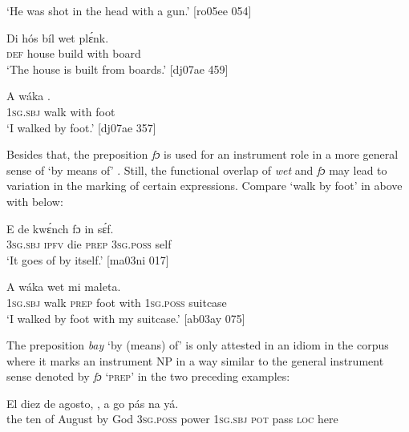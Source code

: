 \glt ‘He was shot in the head with a gun.’ [ro05ee 054]
\z


\ea%
    \label{ex:key:1066}
    \gll Di  hós    bíl    wet    plɛ́nk.\\
\textsc{def}  house  build  with    board\\

\glt ‘The house is built from boards.’ [dj07ae 459]
\z


\ea%
    \label{ex:key:1067}
    \gll A    wáka      .\\
\textsc{1sg.sbj}  walk  with    foot\\

\glt ‘I walked by foot.’ [dj07ae 357]
\z

Besides that, the preposition \textit{fɔ} is used for an instrument role in a more general sense of ‘by means of’ . Still, the functional overlap of \textit{wet} and \textit{fɔ} may lead to variation in the marking of certain expressions. Compare ‘walk by foot’ in  above with  below: 


\ea%
    \label{ex:key:1068}
    \gll E    de  kwɛ́nch  fɔ  in    sɛ́f.\\
\textsc{3sg.sbj}  \textsc{ipfv}  die    \textsc{prep}  \textsc{3sg.poss}  self\\

\glt ‘It goes of by itself.’ [ma03ni 017]\index{}
\z


\ea%
    \label{ex:key:1069}
    \gll A    wáka      wet    mi    maleta.\\
\textsc{1sg.sbj}  walk  \textsc{prep}  foot  with    \textsc{1sg.poss}  suitcase\\

\glt ‘I walked by foot with my suitcase.’ [ab03ay 075]
\z

The preposition \textit{bay} ‘by (means) of’ is only attested in an idiom in the corpus where it marks an instrument NP in a way similar to the general instrument sense denoted by \textit{fɔ} ‘\textsc{prep}’ in the two preceding examples:


\ea%
    \label{ex:key:1070}
    \gll El  diez  de  agosto,          ,  a    go  pás  na  yá.\\
the  ten  of  August  by  God  \textsc{3sg.poss}  power  \textsc{1sg.sbj}  \textsc{pot}  pass  \textsc{loc}  here\\

